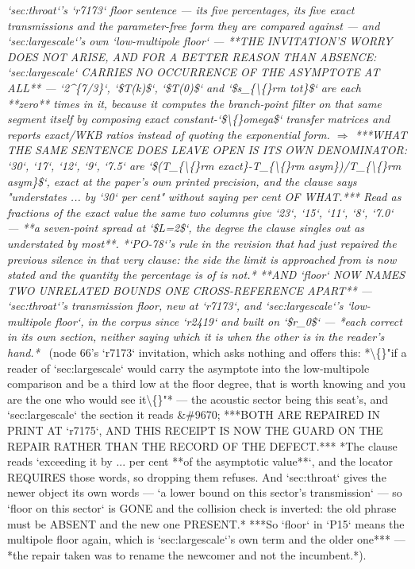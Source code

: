 \begin{description}
\textit{`sec:throat`'s `r7173` floor sentence --- its five percentages, its five exact transmissions and the parameter-free form they are compared against --- and `sec:largescale`'s own `low-multipole floor` ---  **THE INVITATION'S WORRY DOES NOT ARISE, AND FOR A BETTER REASON THAN ABSENCE: `sec:largescale` CARRIES NO OCCURRENCE OF THE ASYMPTOTE AT ALL** --- `2\textasciicircum{}\{7/3\}`, `\$T(k)\$`, `\$T(0)\$` and `\$s\_\{\textbackslash\{\}rm tot\}\$` are each **zero** times in it, because it computes the branch-point filter on that same segment itself by composing exact constant-`\$\textbackslash\{\}omega\$` transfer matrices and reports exact/WKB ratios instead of quoting the exponential form. \ensuremath{\Rightarrow}  ***WHAT THE SAME SENTENCE DOES LEAVE OPEN IS ITS OWN DENOMINATOR: `30`, `17`, `12`, `9`, `7.5` are `\$(T\_\{\textbackslash\{\}rm exact\}-T\_\{\textbackslash\{\}rm asym\})/T\_\{\textbackslash\{\}rm asym\}\$`, exact at the paper's own printed precision, and the clause says "understates ... by `30` per cent" without saying per cent OF WHAT.*** Read as fractions of the exact value the same two columns give `23`, `15`, `11`, `8`, `7.0` --- **a seven-point spread at `\$L=2\$`, the degree the clause singles out as understated by most**. *`PO-78`'s rule in the revision that had just repaired the previous silence in that very clause: the side the limit is approached from is now stated and the quantity the percentage is of is not.*  **AND `floor` NOW NAMES TWO UNRELATED BOUNDS ONE CROSS-REFERENCE APART** --- `sec:throat`'s transmission floor, new at `r7173`, and `sec:largescale`'s `low-multipole floor`, in the corpus since `r2419` and built on `\$r\_0\$` --- *each correct in its own section, neither saying which it is when the other is in the reader's hand.*} \ (node 66's `r7173` invitation, which asks nothing and offers this: *\textbackslash\{\}"if a reader of `sec:largescale` would carry the asymptote into the low-multipole comparison and be a third low at the floor degree, that is worth knowing and you are the one who would see it\textbackslash\{\}"* --- the acoustic sector being this seat's, and `sec:largescale` the section it reads \&\#9670;  ***BOTH ARE REPAIRED IN PRINT AT `r7175`, AND THIS RECEIPT IS NOW THE GUARD ON THE REPAIR RATHER THAN THE RECORD OF THE DEFECT.*** *The clause reads `exceeding it by ... per cent **of the asymptotic value**`, and the locator REQUIRES those words, so dropping them refuses. And `sec:throat` gives the newer object its own words --- `a lower bound on this sector's transmission` --- so `floor on this sector` is GONE and the collision check is inverted: the old phrase must be ABSENT and the new one PRESENT.*  ***So `floor` in `P15` means the multipole floor again, which is `sec:largescale`'s own term and the older one*** --- *the repair taken was to rename the newcomer and not the incumbent.*). 

\end{description}
